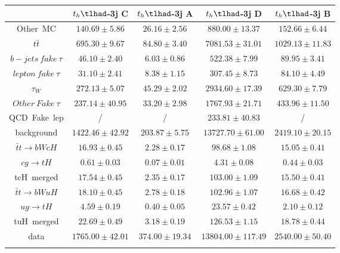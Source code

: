 \begin{tabular}{ccccc} \toprule\toprule
 & $t_{h}\tlhad$-3j C & $t_{h}\tlhad$-3j A & $t_{h}\tlhad$-3j D & $t_{h}\tlhad$-3j B\\\midrule
\hspace{3mm}Other~MC & $140.69\pm5.86$ & $26.16\pm2.56$ & $880.00\pm13.37$ & $152.66\pm6.44$\\
\hspace{3mm}$t\bar{t}$ & $695.30\pm9.67$ & $84.80\pm3.40$ & $7081.53\pm31.01$ & $1029.13\pm11.83$\\
\hspace{3mm}$b-jets~fake~\tau$ & $46.10\pm2.40$ & $6.03\pm0.86$ & $522.38\pm7.99$ & $89.95\pm3.41$\\
\hspace{3mm}$lepton~fake~\tau$ & $31.10\pm2.41$ & $8.38\pm1.15$ & $307.45\pm8.73$ & $84.10\pm4.49$\\
\hspace{3mm}$\tau_{W}$ & $272.13\pm5.07$ & $45.29\pm2.02$ & $2934.60\pm17.39$ & $629.30\pm7.79$\\
\hspace{3mm}$Other~Fake~\tau$ & $237.14\pm40.95$ & $33.20\pm2.98$ & $1767.93\pm21.71$ & $433.96\pm11.50$\\
\hspace{3mm}QCD~Fake~lep &  / &  / & $233.81\pm40.83$ &  /\\
background & $1422.46\pm42.92$ & $203.87\pm5.75$ & $13727.70\pm61.00$ & $2419.10\pm20.15$\\\midrule
\hspace{3mm}$\bar{t}t\to bWcH$ & $16.93\pm0.45$ & $2.28\pm0.17$ & $98.68\pm1.08$ & $15.05\pm0.41$\\
\hspace{3mm}$cg\to tH$ & $0.61\pm0.03$ & $0.07\pm0.01$ & $4.31\pm0.08$ & $0.44\pm0.03$\\
tcH~merged & $17.54\pm0.45$ & $2.35\pm0.17$ & $103.00\pm1.09$ & $15.50\pm0.41$\\
\hspace{3mm}$\bar{t}t\to bWuH$ & $18.10\pm0.45$ & $2.78\pm0.18$ & $102.96\pm1.07$ & $16.68\pm0.42$\\
\hspace{3mm}$ug\to tH$ & $4.59\pm0.19$ & $0.40\pm0.05$ & $23.57\pm0.42$ & $2.10\pm0.12$\\
tuH~merged & $22.69\pm0.49$ & $3.18\pm0.19$ & $126.53\pm1.15$ & $18.78\pm0.44$\\\midrule
data & $1765.00\pm42.01$ & $374.00\pm19.34$ & $13804.00\pm117.49$ & $2540.00\pm50.40$\\
\bottomrule\bottomrule\\
\end{tabular}
